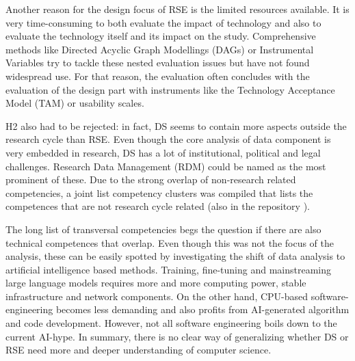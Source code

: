 \documentclass[
        english,biblatex
    ]{lni}
\begin{document}
    Another reason for the design focus of RSE is the limited resources
    available. It is very time-consuming to both evaluate the impact of
    technology and also to evaluate the technology itself and its impact
    on the study. Comprehensive methods like Directed Acyclic Graph
    Modellings (DAGs) or Instrumental Variables try to tackle these
    nested evaluation issues but have not found widespread use. For that
    reason, the evaluation often concludes with the evaluation of the
    design part with instruments like the Technology Acceptance Model
    (TAM) or usability scales.

    H2 also had to be rejected: in fact, DS seems to contain more
    aspects outside the research cycle than RSE. Even though the core
    analysis of data component is very embedded in research, DS has a
    lot of institutional, political and legal challenges. Research Data
    Management (RDM) could be named as the most prominent of these. Due
    to the strong overlap of non-research related competencies, a joint
    list competency clusters was compiled that lists the competences
    that are not research cycle related (also in the repository
    \autocite{ds2rse2025}).

    The long list of transversal competencies begs the question if there
    are also technical competences that overlap. Even though this was
    not the focus of the analysis, these can be easily spotted by
    investigating the shift of data analysis to artificial intelligence
    based methods. Training, fine-tuning and mainstreaming large
    language models requires more and more computing power, stable
    infrastructure and network components. On the other hand, CPU-based
    software-engineering becomes less demanding and also profits from
    AI-generated algorithm and code development. However, not all
    software engineering boils down to the current AI-hype. In summary,
    there is no clear way of generalizing whether DS or RSE need more
    and deeper understanding of computer science.

    \printbibliography

\end{document}
